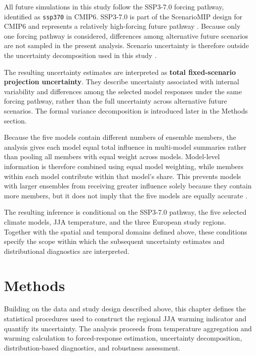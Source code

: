 \documentclass[
]{krantz}
\begin{document}
All future simulations in this study follow the SSP3-7.0 forcing pathway, identified as \texttt{ssp370} in CMIP6. SSP3-7.0 is part of the ScenarioMIP design for CMIP6 and represents a relatively high-forcing future pathway \citep{ONeill2016}. Because only one forcing pathway is considered, differences among alternative future scenarios are not sampled in the present analysis. Scenario uncertainty is therefore outside the uncertainty decomposition used in this study \citep{Hawkins2009}.

The resulting uncertainty estimates are interpreted as \textbf{total fixed-scenario projection uncertainty}. They describe uncertainty associated with internal variability and differences among the selected model responses under the same forcing pathway, rather than the full uncertainty across alternative future scenarios. The formal variance decomposition is introduced later in the Methods section.

Because the five models contain different numbers of ensemble members, the analysis gives each model equal total influence in multi-model summaries rather than pooling all members with equal weight across models. Model-level information is therefore combined using equal model weighting, while members within each model contribute within that model's share. This prevents models with larger ensembles from receiving greater influence solely because they contain more members, but it does not imply that the five models are equally accurate \citep{Tebaldi2007}.

The resulting inference is conditional on the SSP3-7.0 pathway, the five selected climate models, JJA temperature, and the three European study regions. Together with the spatial and temporal domains defined above, these conditions specify the scope within which the subsequent uncertainty estimates and distributional diagnostics are interpreted.

\section{Methods}\label{methods-3}

Building on the data and study design described above, this chapter defines the statistical procedures used to construct the regional JJA warming indicator and quantify its uncertainty. The analysis proceeds from temperature aggregation and warming calculation to forced-response estimation, uncertainty decomposition, distribution-based diagnostics, and robustness assessment.
\end{document}
